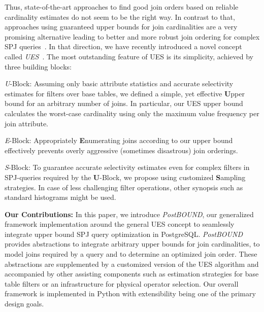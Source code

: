 Thus, state-of-the-art approaches to find good join orders based on reliable cardinality estimates do not seem to be the right way.
In contrast to that, approaches using guaranteed upper bounds for join cardinalities are a very promising alternative leading to better and more robust join ordering for complex SPJ queries~\cite{DBLP:conf/sigmod/CaiBS19,DBLP:journals/corr/abs-2201-04166,hertzschuch-21-ues}. 
In that direction, we have recently introduced a novel concept called \emph{UES}~\cite{hertzschuch-21-ues}. 
The most outstanding feature of UES is its simplicity, achieved by three building blocks:
\begin{compactitem}
\item[\emph{U}-Block:] Assuming only basic attribute statistics and accurate selectivity estimates for filters over base tables, we defined a simple, yet effective \textbf{U}pper bound for an arbitrary number of joins. In particular, our UES upper bound calculates the worst-case cardinality using only the maximum value frequency per join attribute. 
\item[\emph{E}-Block:] Appropriately \textbf{E}numerating joins according to our upper bound effectively prevents overly aggressive (sometimes disastrous) join orderings.
\item[\emph{S}-Block:] To guarantee accurate selectivity estimates even for complex filters in SPJ-queries required by the \textbf{U}-Block, we propose using customized \textbf{S}ampling strategies. In case of less challenging filter operations, other synopsis such as standard histograms might be used.
\end{compactitem}

\textbf{Our Contributions:} 
In this paper, we introduce \emph{PostBOUND}, our generalized framework implementation around the general UES concept to seamlessly integrate upper bound SPJ query optimization in PostgreSQL. 
\emph{PostBOUND} provides abstractions to integrate arbitrary upper bounds for join cardinalities, to model joins required by a query and to determine an optimized join order.
These abstractions are supplemented by a customized version of the UES algorithm and accompanied by other assisting components such as estimation strategies for base table filters or an infrastructure for physical operator selection.
Our overall framework is implemented in Python with extensibility being one of the primary design goals.%

